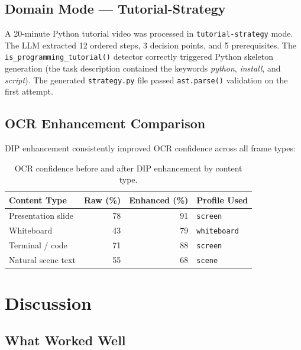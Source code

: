 \documentclass[12pt,a4paper]{article}
\begin{document}
\subsection{Domain Mode — Tutorial-Strategy}

A 20-minute Python tutorial video was processed in \texttt{tutorial-strategy} mode.
The LLM extracted 12 ordered steps, 3 decision points, and 5 prerequisites. The
\texttt{is\_programming\_tutorial()} detector correctly triggered Python skeleton
generation (the task description contained the keywords \textit{python}, \textit{install},
and \textit{script}). The generated \texttt{strategy.py} file passed \texttt{ast.parse()}
validation on the first attempt.

\subsection{OCR Enhancement Comparison}

DIP enhancement consistently improved OCR confidence across all frame types:

\begin{table}[H]
\centering
\caption{OCR confidence before and after DIP enhancement by content type.}
\label{tab:ocr}
\begin{tabular}{@{}lrrl@{}}
\toprule
\textbf{Content Type} & \textbf{Raw (\%)} & \textbf{Enhanced (\%)} & \textbf{Profile Used} \\
\midrule
Presentation slide    & 78 & 91 & \texttt{screen} \\
Whiteboard            & 43 & 79 & \texttt{whiteboard} \\
Terminal / code       & 71 & 88 & \texttt{screen} \\
Natural scene text    & 55 & 68 & \texttt{scene} \\
\bottomrule
\end{tabular}
\end{table}

\section{Discussion}
\label{sec:discussion}

\subsection{What Worked Well}
\end{document}
